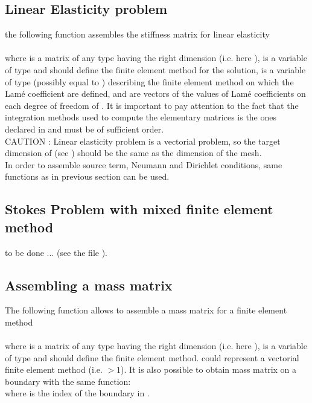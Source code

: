 \documentclass[11pt,a4paper]{article}
\begin{document}
\subsection{Linear Elasticity problem}

the following function assembles the stiffness matrix for linear elasticity\\[0.5cm]
 \\[0.5cm]
where  is a matrix of any type having the right dimension (i.e. here ),  is a variable of type  and should define the finite element method for the solution,   is a variable of type  (possibly equal to ) describing the finite element method on which the Lam{\'e} coefficient are defined,  and  are vectors of the values of Lam{\'e} coefficients on each degree of freedom of . It is important to pay attention to the fact that the integration methods used to compute the elementary matrices is the ones declared in  and must be of sufficient order.\\[0.5cm]

CAUTION : Linear elasticity problem is a vectorial problem, so the target dimension of  (see ) should be the same as the dimension of the mesh.\\[0.5cm]

In order to assemble source term, Neumann and Dirichlet conditions, same functions as in previous section can be used.

\subsection{Stokes Problem with mixed finite element method}

to be done ... (see the file ).
 
\subsection{Assembling a mass matrix}

The following function allows to assemble a mass matrix for a finite element method\\[0.5cm]
 \\[0.5cm]
where  is a matrix of any type having the right dimension (i.e. here ),  is a variable of type  and should define the finite element method.  could represent a vectorial finite element method (i.e.  $> 1$).
It is also possible to obtain  mass matrix on a boundary with the same function:
 \\[0.5cm]
where  is the index of the boundary in .
\end{document}
